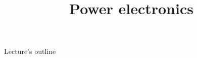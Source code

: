 \documentclass{../course_template/lectureClass}
\begin{document}
\title[Power electronics]{Power electronics}
\date{}
\begin{frame}[plain]
    \titlepage
\end{frame}

\begin{frame}{Lecture's outline}
    \tableofcontents[hideallsubsections]
\end{frame}


\end{document}

